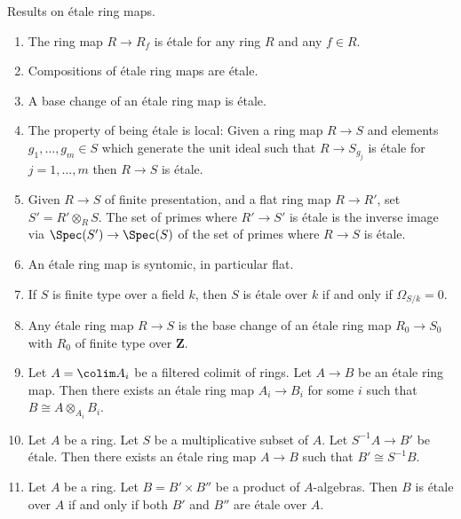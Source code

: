 \begin{lemma}
\label{lemma-etale}
Results on \'etale ring maps.
\begin{enumerate}
\item The ring map $R \to R_f$ is \'etale for any ring $R$ and any $f \in R$.
\item Compositions of \'etale ring maps are \'etale.
\item A base change of an \'etale ring map is \'etale.
\item The property of being \'etale is local: Given a ring map
$R \to S$ and elements $g_1, \ldots, g_m \in S$ which generate the unit ideal
such that $R \to S_{g_j}$ is \'etale for $j = 1, \ldots, m$ then
$R \to S$ is \'etale.
\item Given $R \to S$ of finite presentation, and a flat ring map
$R \to R'$, set $S' = R' \otimes_R S$. The set of primes where $R' \to S'$
is \'etale is the inverse image via $\Spec(S') \to \Spec(S)$
of the set of primes where $R \to S$ is \'etale.
\item An \'etale ring map is syntomic, in particular flat.
\item If $S$ is finite type over a field $k$, then $S$ is \'etale over
$k$ if and only if $\Omega_{S/k} = 0$.
\item Any \'etale ring map $R \to S$ is the base change of an \'etale
ring map $R_0 \to S_0$ with $R_0$ of finite type over $\mathbf{Z}$.
\item Let $A = \colim A_i$ be a filtered colimit of rings.
Let $A \to B$ be an \'etale ring map. Then there exists an \'etale ring
map $A_i \to B_i$ for some $i$ such that $B \cong A \otimes_{A_i} B_i$.
\item Let $A$ be a ring. Let $S$ be a multiplicative subset of $A$.
Let $S^{-1}A \to B'$ be \'etale. Then there exists an \'etale ring map
$A \to B$ such that $B' \cong S^{-1}B$.
\item Let $A$ be a ring. Let $B = B' \times B''$ be a product of $A$-algebras.
Then $B$ is \'etale over $A$ if and only if both $B'$ and $B''$ are
\'etale over $A$.
\end{enumerate}
\end{lemma}

